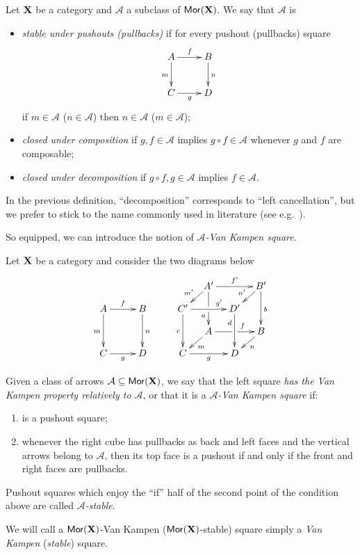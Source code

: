 \begin{definition}
	Let $\textbf {\textup{X}}$ be a category and $\mathcal{A}$ a  subclass of $\mathsf{Mor}(\textbf {\textup{X}})$. We say that  $\mathcal{A}$ is
	\begin{itemize}
		\item 
		\emph{stable under pushouts (pullbacks)} if for every pushout (pullbacks) square 
		\[\xymatrix{A\ar[r]^f  \ar[d]_{m}& B \ar[d]^n \\ C \ar[r]_g & D}\]
		if $m \in \mathcal{A}$ ($n\in \mathcal{A}$) then $n \in \mathcal{A}$ ($m \in \mathcal{A}$);
		\item \emph{closed under composition} if $g, f\in \mathcal{A}$ implies $g\circ f\in \mathcal{A}$ whenever $g$ and $f$ are composable;
		\item \emph{closed under decomposition} if $g\circ f, g\in \mathcal{A}$ implies $f\in \mathcal{A}$.
	\end{itemize}
\end{definition}

\begin{remark}In the previous definition, ``decomposition'' corresponds to ``left cancellation'', but we prefer to stick to the name commonly used in literature (see e.g.~\cite{habel2012mathcal}).
\end{remark}


So equipped, we can introduce the notion of \emph{$\mathcal{A}$-Van Kampen square}.
\begin{definition} Let $\textbf {\textup{X}}$ be a category  and consider the two diagrams below
	\[\xymatrix@C=10pt@R=10pt{&&&&&A'\ar[dd]|\hole_(.65){a}\ar[rr]^{f'} \ar[dl]_{m'} && B' \ar[dd]^{b} \ar[dl]_{n'} \\ A \ar[dd]_{m}\ar[rr]^{f}&&B\ar[dd]^{n}&&C'  \ar[dd]_{c}\ar[rr]^(.7){g'} & & D' \ar[dd]_(.3){d}\\&&&&&A\ar[rr]|\hole^(.65){f} \ar[dl]^{m} && B \ar[dl]^{n} \\C\ar[rr]_{g} &&D&&C \ar[rr]_{g} & & D}\]
	
	Given  a class of arrows $\mathcal{A}\subseteq \mathsf{Mor}(\textbf {\textup{X}})$, we say that the left square \emph{has the Van Kampen property relatively to $\mathcal{A}$}, or that it  is a \emph{$\mathcal{A}$-Van Kampen square} if:
	\begin{enumerate}
		\item is a pushout square;
		\item 	whenever the right cube has pullbacks as back and left faces and the vertical arrows belong to $\mathcal{A}$, then its top face is a pushout if and only if the front and right faces are pullbacks.
	\end{enumerate}
	Pushout squares which enjoy the ``if'' half of the second point of the condition above are called \emph{$\mathcal{A}$-stable}. 
	
We will call a $\mathsf{Mor}(\textbf {\textup{X}})$-Van Kampen ($\mathsf{Mor}(\textbf {\textup{X}})$-stable) square simply a \emph{Van Kampen} (\emph{stable}) square.
\end{definition}

